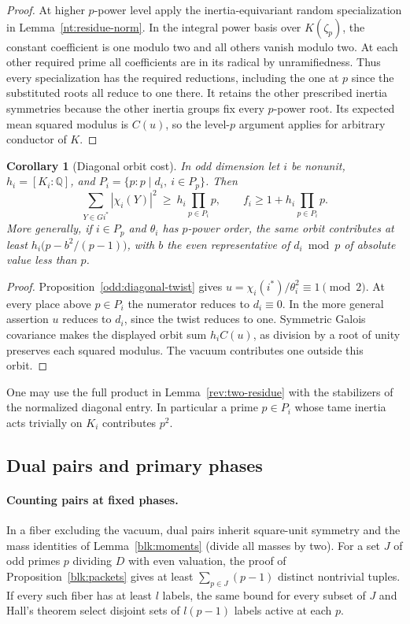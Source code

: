 \documentclass[11pt]{amsart}
\numberwithin{equation}{section}
\newtheorem{corollary}[theorem]{Corollary}
\theoremstyle{definition}
\theoremstyle{plain}
\newcommand{\QQ}{\mathbb Q}
\begin{document}
\begin{proof}
At higher $p$-power level apply the inertia-equivariant random
specialization in Lemma~\ref{nt:residue-norm}. In the integral power
basis over $K(\zeta_p)$, the constant coefficient is one modulo
two and all others vanish modulo two. At each other required prime
all coefficients are in its radical by unramifiedness. Thus every
specialization has the required reductions, including the one at $p$
since the substituted roots all reduce to one there. It retains the
other prescribed inertia symmetries because the other inertia groups
fix every $p$-power root. Its expected mean squared modulus is $C(u)$,
so the level-$p$ argument applies for arbitrary conductor of $K$.
\end{proof}

\begin{corollary}[Diagonal orbit cost]\label{rev:diagonal-cost}
In odd dimension let $i$ be nonunit, $h_i=[K_i:\QQ]$, and
$P_i=\{p:p\mid d_i,\ i\in P_p\}$. Then
\[
 \sum_{Y\in G i^*}|\chi_i(Y)|^2\ \ge\ h_i\prod_{p\in P_i}p,
 \qquad f_i\ge1+h_i\prod_{p\in P_i}p.
\]
More generally, if $i\in P_p$ and $\theta_i$ has $p$-power order,
the same orbit contributes at least
$h_i\bigl(p-b^2/(p-1)\bigr)$, with $b$ the even representative of
$d_i\bmod p$ of absolute value less than $p$.
\end{corollary}
\begin{proof}
Proposition~\ref{odd:diagonal-twist} gives
$u=\chi_i(i^*)/\theta_i^2\equiv1\pmod2$. At every place above
$p\in P_i$ the numerator reduces to $d_i\equiv0$.
In the more general assertion $u$ reduces to $d_i$, since the
twist reduces to one. Symmetric Galois covariance makes the displayed
orbit sum $h_i C(u)$, as division by a root of unity preserves each
squared modulus. The vacuum contributes one outside this orbit.
\end{proof}
One may use the full product in Lemma~\ref{rev:two-residue} with the
stabilizers of the normalized diagonal entry. In particular a prime
$p\in P_i$ whose tame inertia acts trivially on $K_i$ contributes $p^2$.

\subsection{Dual pairs and primary phases}
\paragraph{Counting pairs at fixed phases.}
In a fiber excluding the vacuum, dual pairs inherit square-unit symmetry and the mass identities of Lemma~\ref{blk:moments} (divide all masses by two). For a set $J$ of odd primes $p$ dividing $D$ with even valuation, the proof of Proposition~\ref{blk:packets} gives at least $\sum_{p\in J}(p-1)$ distinct nontrivial tuples. If every such fiber has at least $l$ labels, the same bound for every subset of $J$ and Hall's theorem select disjoint sets of $l(p-1)$ labels active at each $p$.
\end{document}
